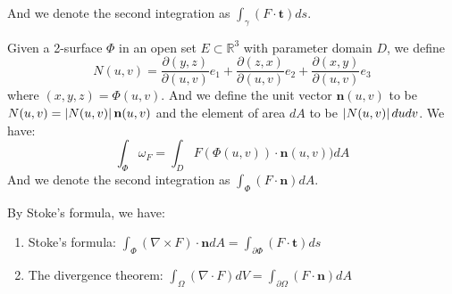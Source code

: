 And we denote the second integration as $\int_{\gamma}{(F\cdot \mathbf{t})ds}$.\par
Given a 2-surface $\Phi$ in an open set $E\subset \mathbb{R}^3$ with parameter domain $D$, we define 
\begin{equation*}
    N(u,v)=\frac{\partial(y,z)}{\partial(u,v)}e_1+\frac{\partial(z,x)}{\partial(u,v)}e_2+\frac{\partial(x,y)}{\partial(u,v)}e_3   
\end{equation*}
where $(x,y,z)=\Phi(u,v)$. And we define the unit vector $\mathbf{n}(u,v)$ to be $N(u,v)=\left\lvert N(u,v)\right\rvert\mathbf{n}(u,v)$ and the element of area $dA$ to be $\left\lvert N(u,v)\right\rvert dudv$. We have:
\begin{equation*}
    \int_{\Phi}{\omega_F}=\int_{D}{F(\Phi(u,v))\cdot \mathbf{n}(u,v))dA}
\end{equation*}
And we denote the second integration as $\int_{\Phi}{(F\cdot \mathbf{n})dA}$.\par
By Stoke's formula, we have:
\begin{enumerate}
    \item Stoke's formula: $\int_{\Phi}{(\nabla\times F)\cdot \mathbf{n}dA}=\int_{\partial\Phi}{(F\cdot \mathbf{t})ds}$
    \item The divergence theorem: $\int_{\Omega}{(\nabla\cdot F)dV}=\int_{\partial\Omega}{(F\cdot \mathbf{n})dA}$
\end{enumerate}
% 

